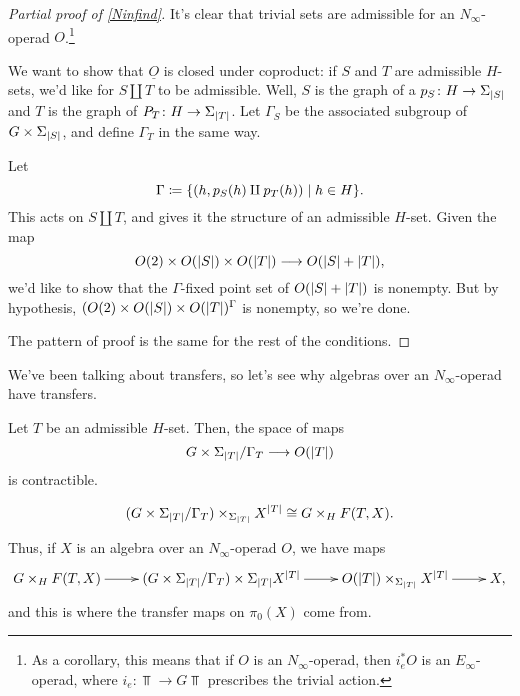 \begin{proof}[Partial proof of \cref{Ninfind}]
It's clear that trivial sets are admissible for an $N_\infty$-operad $O$.\footnote{As a corollary, this means that
if $O$ is an $N_\infty$-operad, then $i_e^*O$ is an $E_\infty$-operad, where $i_e\colon\Top\to G\Top$ prescribes
the trivial action.}

We want to show that $\underline O$ is closed under coproduct: if $S$ and $T$ are admissible $H$-sets, we'd like
for $S\amalg T$ to be admissible. Well, $S$ is the graph of a $p_S\colon H\to\Sigma_{\lvert S\rvert}$ and $T$ is the graph
of $P_T\colon H\to\Sigma_{\lvert T\rvert}$. Let $\Gamma_S$ be the associated subgroup of $G\times\Sigma_{\lvert S\rvert}$, and
define $\Gamma_T$ in the same way.

Let
\[\Gamma\coloneqq \{(h, p_S(h)\amalg p_T(h))\mid h\in H\}.\]
This acts on $S\amalg T$, and gives it the structure of an admissible $H$-set. Given the map
\[O(2)\times O(\lvert S\rvert)\times O(\lvert T\rvert)\longrightarrow O(\lvert S\rvert + \lvert T\rvert),\]
we'd like to show that the $\Gamma$-fixed point set of $O(\lvert S\rvert + \lvert T\rvert)$ is nonempty. But by hypothesis,
$(O(2)\times O(\lvert S\rvert)\times O(\lvert T\rvert)^\Gamma$ is nonempty, so we're done.

The pattern of proof is the same for the rest of the conditions.
\end{proof}
We've been talking about transfers, so let's see why algebras over an $N_\infty$-operad have transfers.

Let $T$ be an admissible $H$-set. Then, the space of maps
\[G\times\Sigma_{\lvert T\rvert}/\Gamma_T\longrightarrow O(\lvert T\rvert)\]
is contractible.
\begin{lem}
\[(G\times\Sigma_{\lvert T\rvert}/\Gamma_T)\times_{\Sigma_{\lvert T\rvert}} X^{\lvert T\rvert} \cong G\times_H F(T,X).\]
\end{lem}
Thus, if $X$ is an algebra over an $N_\infty$-operad $O$, we have maps
\[\xymatrix{
	G\times_H F(T,X)\ar[r] & (G\times\Sigma_{\abs T}/\Gamma_T)\times\Sigma_{\abs T} X^{\abs T}\ar[r] & O(\abs
	T)\times_{\Sigma_{\abs T}} X^{\abs T}\ar[r] & X,
}\]
and this is where the transfer maps on $\pi_0(X)$ come from.

